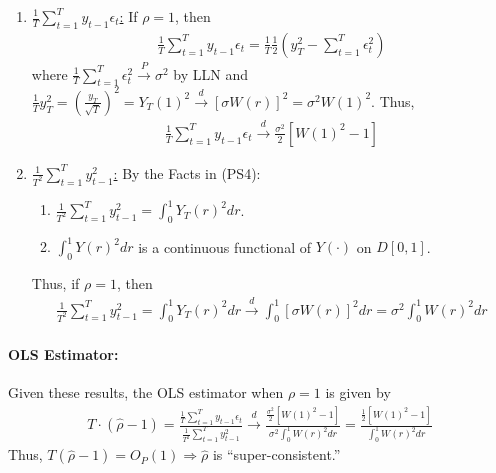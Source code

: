 \documentclass[11pt]{elegantbook}
\begin{document}
\begin{enumerate}
    \item \underline{$\frac{1}{T}\sum_{t=1}^Ty_{t-1}\epsilon_t$:} If $\rho=1$, then
    \begin{equation}
        \begin{aligned}
            \frac{1}{T}\sum_{t=1}^T y_{t-1}\epsilon_t=\frac{1}{T}\frac{1}{2}\left(y_T^2-\sum_{t=1}^T\epsilon_t^2\right)
        \end{aligned}
        \nonumber
    \end{equation}
    where $\frac{1}{T}\sum_{t=1}^T\epsilon_t^2 \stackrel{P}{\longrightarrow} \sigma^2$ by LLN and $\frac{1}{T}y_T^2=\left(\frac{y_T}{\sqrt{T}}\right)^2=Y_T(1)^2\stackrel{d}{\longrightarrow} [\sigma W(r)]^2=\sigma^2W(1)^2$. Thus,
    \begin{equation}
        \begin{aligned}
            \frac{1}{T}\sum_{t=1}^T y_{t-1}\epsilon_t \stackrel{d}{\longrightarrow} \frac{\sigma^2}{2}\left[W(1)^2-1\right]
        \end{aligned}
        \nonumber
    \end{equation}
    \item \underline{$\frac{1}{T^2}\sum_{t=1}^Ty_{t-1}^2$:}
    By the Facts in (PS4):
    \begin{enumerate}
        \item $\frac{1}{T^2}\sum_{t=1}^Ty_{t-1}^2 = \int_0^1 Y_T(r)^2 dr$.
        \item $\int_0^1 Y(r)^2 dr$ is a continuous functional of $Y(\cdot)$ on $D[0,1]$.
    \end{enumerate}
    Thus, if $\rho=1$, then
    \begin{equation}
        \begin{aligned}
            \frac{1}{T^2}\sum_{t=1}^Ty_{t-1}^2 = \int_0^1 Y_T(r)^2 dr \stackrel{d}{\longrightarrow} \int_0^1 [\sigma W(r)]^2 dr = \sigma^2 \int_0^1 W(r)^2 dr
        \end{aligned}
        \nonumber
    \end{equation}
\end{enumerate}

\paragraph*{OLS Estimator:}
Given these results, the OLS estimator when $\rho=1$ is given by
\begin{equation}
    \begin{aligned}
        T\cdot(\hat{\rho}-1)=\frac{\frac{1}{T}\sum_{t=1}^Ty_{t-1}\epsilon_t}{\frac{1}{T^2}\sum_{t=1}^Ty_{t-1}^2} \stackrel{d}{\longrightarrow} \frac{\frac{\sigma^2}{2}\left[W(1)^2-1\right]}{\sigma^2 \int_0^1 W(r)^2 dr}=\frac{\frac{1}{2}\left[W(1)^2-1\right]}{\int_0^1 W(r)^2 dr}
    \end{aligned}
    \nonumber
\end{equation}
Thus, $T(\hat{\rho}-1)=O_P(1) \Rightarrow \hat{\rho}$ is ``super-consistent.''
\end{document}
